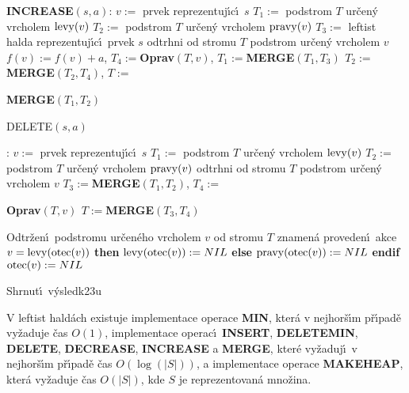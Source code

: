 {\bf INCREASE$(s,a)$}:\newline 
$v:=$ prvek reprezentuj\'\i c\'\i\ $s$\newline 
$T_1:=$ podstrom $T$ ur\v cen\'y vrcholem $\operatorname{levy}(v)$\newline 
$T_2:=$ podstrom $T$ ur\v cen\'y  vrcholem $\operatorname{pravy}(v)$\newline 
$T_3:=$ leftist halda reprezentuj\'\i c\'\i\ prvek $s$\newline 
odtrhni od stromu $T$ podstrom ur\v cen\'y vrcholem $v$\newline 
$f(v):=f(v)+a$, $T_4:=${\bf Oprav$(T,v)$}, $T_1:=${\bf MERGE$(T_1
,T_3)$\newline 
$T_2:=$MERGE$(T_2,T_4)$}, $T:=${\bf MERGE$(T_1,T_2)$
\bigskip

DELETE$(s,a)$}:\newline 
$v:=$ prvek reprezentuj\'\i c\'\i\ $s$\newline 
$T_1:=$ podstrom $T$ ur\v cen\'y vrcholem $\operatorname{levy}(v)$\newline 
$T_2:=$ podstrom $T$ ur\v cen\'y  vrcholem $\operatorname{pravy}(v)$\newline 
odtrhni od stromu $T$ podstrom ur\v cen\'y vrcholem $v$\newline 
$T_3:=${\bf MERGE$(T_1,T_2)$}, $T_4:=${\bf Oprav$(T,v)$\newline 
$T:=$MERGE$(T_3,T_4)$
\bigskip

}\flushpar Odtr\v zen\'\i\ podstromu ur\v cen\'eho vrcholem $v$ od stromu $
T$ 
znamen\'a proveden\'\i\ akce\medskip
{} $v=\operatorname{levy}(\operatorname{otec}(v))$ {\bf then}\newline 
\phantom{---}$\operatorname{levy}(\operatorname{otec}(v)):=NIL$\newline 
{\bf else}\newline 
\phantom{---}$\operatorname{pravy}(\operatorname{otec}(v)):=NIL$\newline 
{\bf endif}\newline 
$\operatorname{otec}(v):=NIL$
\medskip

\subhead
Shrnut\'\i\ v\'ysledk\accent23u
\endsubhead

V leftist hald\'ach existuje implementace operace 
{\bf MIN}, kter\'a v nejhor\v s\'\i m p\v r\'\i pad\v e vy\v zaduje \v cas $
O(1)$, 
implementace ope\-rac\'\i\ {\bf INSERT}, {\bf DELETEMIN}, {\bf DELETE}, 
{\bf DEC\-REA\-SE}, {\bf INCREA\-SE} a {\bf MERGE}, kter\'e vy\v zaduj\'\i\ v nejhor\v s\'\i m 
p\v r\'\i\-pa\-d\v e \v cas $O(\log(|S|))$, a implementace operace {\bf MAKE\-HEAP},
kter\'a vy\v zaduje \v cas $O(|S|)$, kde $S$ je reprezentovan\'a mno\v zina.
\endproclaim
\medskip


